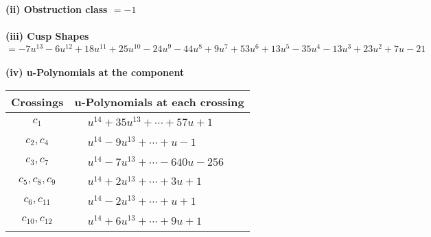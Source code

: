 \documentclass[1p]{elsarticle_modified}
\theoremstyle{definition}
\begin{document}
\flushleft \textbf{(ii) Obstruction class $= -1$}\\~\\
\flushleft \textbf{(iii) Cusp Shapes $= -7 u^{13}-6 u^{12}+18 u^{11}+25 u^{10}-24 u^9-44 u^8+9 u^7+53 u^6+13 u^5-35 u^4-13 u^3+23 u^2+7 u-21$}\\~\\
\newpage\renewcommand{\arraystretch}{1}
\flushleft \textbf{(iv) u-Polynomials at the component}\newline \\
\begin{tabular}{m{50pt}|m{274pt}}
Crossings & \hspace{64pt}u-Polynomials at each crossing \\
\hline $$\begin{aligned}c_{1}\end{aligned}$$&$\begin{aligned}
&u^{14}+35 u^{13}+\cdots+57 u+1
\end{aligned}$\\
\hline $$\begin{aligned}c_{2},c_{4}\end{aligned}$$&$\begin{aligned}
&u^{14}-9 u^{13}+\cdots+u-1
\end{aligned}$\\
\hline $$\begin{aligned}c_{3},c_{7}\end{aligned}$$&$\begin{aligned}
&u^{14}-7 u^{13}+\cdots-640 u-256
\end{aligned}$\\
\hline $$\begin{aligned}c_{5},c_{8},c_{9}\end{aligned}$$&$\begin{aligned}
&u^{14}+2 u^{13}+\cdots+3 u+1
\end{aligned}$\\
\hline $$\begin{aligned}c_{6},c_{11}\end{aligned}$$&$\begin{aligned}
&u^{14}-2 u^{13}+\cdots+u+1
\end{aligned}$\\
\hline $$\begin{aligned}c_{10},c_{12}\end{aligned}$$&$\begin{aligned}
&u^{14}+6 u^{13}+\cdots+9 u+1
\end{aligned}$\\
\hline
\end{tabular}\\~\\
\end{document}
